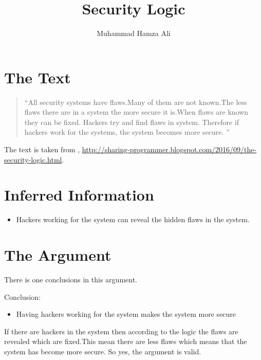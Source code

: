 \documentclass{article}
\title{Security Logic}  %
\author{Muhammad Hamza Ali} %
\begin{document}
\maketitle

\section{The Text}

\begin{quotation}
  ``All security systems have flaws.Many of them are not known.The less flaws there are in a system the more secure it is.When flaws are known they can be fixed. Hackers try and find flaws in system. Therefore if hackers work for the systems, the system becomes more secure. ''\end{quotation}
The text is taken from , \url{http://sharing-programmer.blogspot.com/2016/09/the-security-logic.html}.

\section{Inferred Information}

\begin{itemize}
\item Hackers working for the system can reveal the hidden flaws in the system.

\end{itemize}

\section{The Argument}

There is one conclusions in this argument.

Conclusion:
\begin{itemize}
\item Having hackers working for the system makes the system more secure
\end{itemize}

If there are hackers in the system then according to the logic the flaws are revealed which are fixed.This mean there are less flaws which means that the system has become more secure. So yes, the argument is valid.
\end{document}
